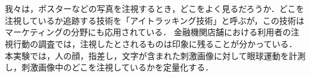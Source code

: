 \chapter{\kadaid}\label{chap:\kadaid}
\section{\purpose}
我々は，ポスターなどの写真を注視するとき，どこをよく見るだろうか．どこを注視しているか追跡する技術を「アイトラッキング技術」と呼ぶが，この技術はマーケティングの分野にも応用されている．
金融機関店舗における利用者の注視行動の調査\cite{アイトラッキング技術を用いた地域実践的研究の報告}では，注視したとされるものは印象に残ることが分かっている．
本実験では，人の顔，指差し，文字が含まれた刺激画像に対して眼球運動を計測し，刺激画像中のどこを注視しているかを定量化する．
\section{\method}
